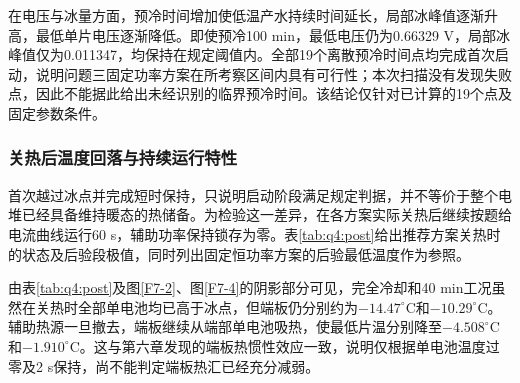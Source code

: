 \documentclass[bwprint]{gmcmthesis}
\numberwithin{figure}{section}
\begin{document}
在电压与冰量方面，预冷时间增加使低温产水持续时间延长，局部冰峰值逐渐升高，最低单片电压逐渐降低。即使预冷100 min，最低电压仍为0.66329 V，局部冰峰值仅为0.011347，均保持在规定阈值内。全部19个离散预冷时间点均完成首次启动，说明问题三固定功率方案在所考察区间内具有可行性；本次扫描没有发现失败点，因此不能据此给出未经识别的临界预冷时间。该结论仅针对已计算的19个点及固定参数条件。

\subsubsection{关热后温度回落与持续运行特性}

首次越过冰点并完成短时保持，只说明启动阶段满足规定判据，并不等价于整个电堆已经具备维持暖态的热储备。为检验这一差异，在各方案实际关热后继续按题给电流曲线运行60 s，辅助功率保持锁存为零。表\ref{tab:q4:post}给出推荐方案关热时的状态及后验段极值，同时列出固定恒功率方案的后验最低温度作为参照。

\begin{table}[htbp]
    \centering
    \caption{推荐动态策略关热状态及关热后60 s的运行结果}
    \vspace{0.3cm}
    \label{tab:q4:post}
    \renewcommand{\arraystretch}{1.5}
\end{table}

由表\ref{tab:q4:post}及图\ref{F7-2}、图\ref{F7-4}的阴影部分可见，完全冷却和40 min工况虽然在关热时全部单电池均已高于冰点，但端板仍分别约为\(-14.47^\circ\mathrm C\)和\(-10.29^\circ\mathrm C\)。辅助热源一旦撤去，端板继续从端部单电池吸热，使最低片温分别降至\(-4.508^\circ\mathrm C\)和\(-1.910^\circ\mathrm C\)。这与第六章发现的端板热惯性效应一致，说明仅根据单电池温度过零及2 s保持，尚不能判定端板热汇已经充分减弱。
\end{document}
